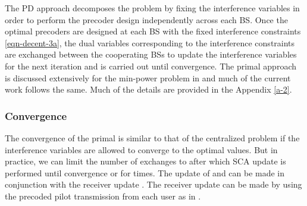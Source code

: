 
The \acl{PD} approach decomposes the problem by fixing the interference variables  in order to perform the precoder design independently across each \ac{BS}. Once the optimal precoders are designed at each \ac{BS} with the fixed interference constraints \eqref{eqn-decent-3a}, the dual variables corresponding to the interference constraints are exchanged between the cooperating \acp{BS}  to update the interference variables  for the next iteration and is carried out until convergence. The primal approach is discussed extensively for the min-power problem in \cite{pennanen2011decentralized} and much of the current work follows the same. Much of the details are provided in the Appendix \ref{a-2}.

\subsubsection*{Convergence}
The convergence of the primal is similar to that of the centralized problem if the interference variables  are allowed to converge to the optimal values. But in practice, we can limit the number of exchanges to  after which \ac{SCA} update is performed until convergence or for  times. The update of  and  can be made in conjunction with the receiver update . The receiver update can be made by using the precoded pilot transmission from each user as in \cite{komulainen2013effective}. 
